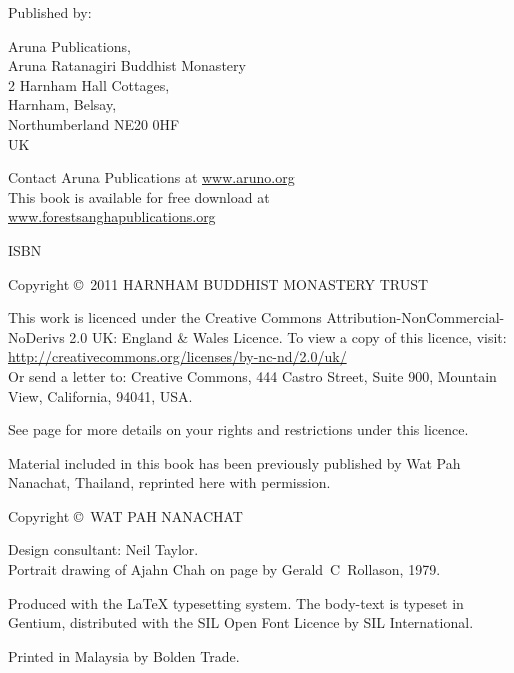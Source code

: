 {
\mbox{}\newpage\thispagestyle{empty}%
{\Small\setlength{\parskip}{1em}\setlength{\parindent}{0em}%
{\raggedright%

\thetitle

Published by:

Aruna Publications,\\
Aruna Ratanagiri Buddhist Monastery\\
2 Harnham Hall Cottages,\\
Harnham, Belsay,\\
Northumberland NE20 0HF\\
UK

Contact Aruna Publications at \href{http://aruno.org}{www.aruno.org}\\
This book is available for free download at\\
\href{http://forestsanghapublications.org/}{www.forestsanghapublications.org}

ISBN \theISBN

Copyright \copyright\ 2011 HARNHAM BUDDHIST MONASTERY TRUST

\vfill

{\copyrightsmall

This work is licenced under the Creative Commons Attribution-NonCommercial-NoDerivs 2.0 UK: England \& Wales Licence. To view a copy of this licence, visit:\\
\href{http://creativecommons.org/licenses/by-nc-nd/2.0/uk/}{http://creativecommons.org/licenses/by-nc-nd/2.0/uk/}\\
Or send a letter to: Creative Commons, 444 Castro Street, Suite 900, Mountain View, California, 94041, USA.

See page \pageref{cc-details} for more details on your rights and restrictions under this licence.

Material included in this book has been previously published by Wat Pah Nanachat, Thailand, reprinted here with permission.

Copyright \copyright\ WAT PAH NANACHAT

Design consultant: Neil Taylor.\\ Portrait drawing of Ajahn Chah on page \pageref{aj-chah-portrait} by Gerald~C~Rollason, 1979.

Produced with the {\selectfont\LaTeX} typesetting system. The body-text is typeset in Gentium, distributed with the SIL Open Font Licence by SIL International.

\theEditionInfo

Printed in Malaysia by Bolden Trade.

}

}}

}
